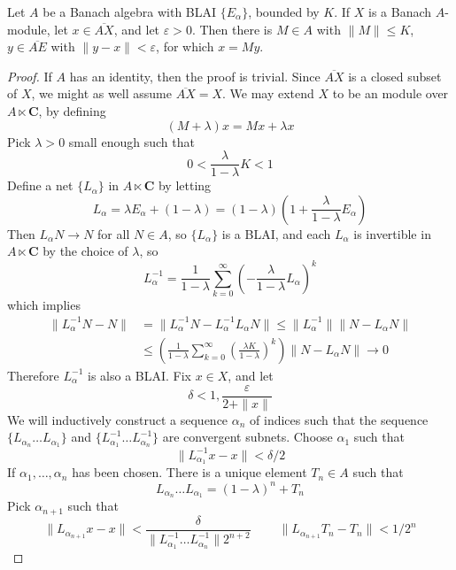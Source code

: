 \begin{theorem}
    Let $A$ be a Banach algebra with BLAI $\{ E_\alpha \}$, bounded by $K$. If $X$ is a Banach $A$-module, let $x \in \overline{AX}$, and let $\varepsilon > 0$. Then there is $M \in A$ with $\| M \| \leq K$, $y \in \overline{AE}$ with $\| y - x \| < \varepsilon$, for which $x = My$.
\end{theorem}
\begin{proof}
    If $A$ has an identity, then the proof is trivial. Since $\overline{AX}$ is a closed subset of $X$, we might as well assume $\overline{AX} = X$. We may extend $X$ to be an module over $A \ltimes \mathbf{C}$, by defining 
    \[ (M + \lambda) x = Mx + \lambda x \]
    Pick $\lambda > 0$ small enough such that
    \[ 0 < \frac{\lambda}{1 - \lambda} K < 1 \]
    Define a net $\{ L_\alpha \}$ in $A \ltimes \mathbf{C}$ by letting
    \[ L_\alpha = \lambda E_\alpha + (1 - \lambda) = (1 - \lambda) \left( 1 + \frac{\lambda}{1 - \lambda} E_\alpha \right) \]
    Then $L_\alpha N \to N$ for all $N \in A$, so $\{ L_\alpha \}$ is a BLAI, and each $L_\alpha$ is invertible in $A \ltimes \mathbf{C}$ by the choice of $\lambda$, so
    \[ L_\alpha^{-1} = \frac{1}{1 - \lambda} \sum_{k = 0}^\infty \left(- \frac{\lambda}{1 - \lambda} L_\alpha \right)^k \]
    which implies
    \begin{align*}
        \| L_\alpha^{-1} N - N \| &= \| L_\alpha^{-1} N - L_\alpha^{-1} L_\alpha N \| \leq \| L_\alpha^{-1} \| \| N - L_\alpha N \|\\
        &\leq \left( \frac{1}{1 - \lambda} \sum_{k = 0}^\infty \left( \frac{\lambda K}{1 - \lambda} \right)^k \right) \| N - L_\alpha N \| \to 0
    \end{align*}
    Therefore $L_\alpha^{-1}$ is also a BLAI. Fix $x \in X$, and let
    \[ \delta < 1, \frac{\varepsilon}{2 + \|x\|} \]
    We will inductively construct a sequence $\alpha_n$ of indices such that the sequence $\{ L_{\alpha_n} \dots L_{\alpha_1} \}$ and $\{ L_{\alpha_1}^{-1} \dots L_{\alpha_n}^{-1} \}$ are convergent subnets. Choose $\alpha_1$ such that
    \[ \| L_{\alpha_1}^{-1} x - x \| < \delta/2 \]
    If $\alpha_1, \dots, \alpha_n$ has been chosen. There is a unique element $T_n \in A$ such that
    \[  L_{\alpha_n} \dots L_{\alpha_1} = (1 - \lambda)^n + T_n \]
    Pick $\alpha_{n+1}$ such that
    \[ \| L_{\alpha_{n+1}} x - x \| < \frac{\delta}{\| L_{\alpha_1}^{-1} \dots L_{\alpha_n}^{-1} \| 2^{n+2}}\ \ \ \ \ \ \ \ \ \ \| L_{\alpha_{n+1}} T_n - T_n \| < 1/2^n \]

\end{proof}
